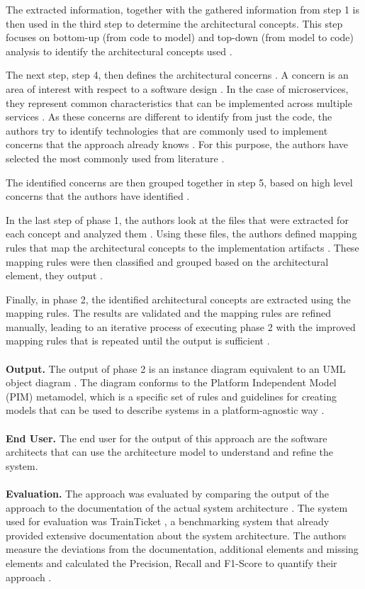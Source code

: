 The extracted information, together with the gathered information from step 1 is then used in the third step to determine the architectural concepts.
This step focuses on bottom-up (from code to model) and top-down (from model to code) analysis to identify the architectural concepts used \cite{Alshuqayran2018MiSAR}.

The next step, step 4, then defines the architectural concerns \cite{Alshuqayran2018MiSAR}.
A concern is an area of interest with respect to a software design \cite{SWEBOK}.
In the case of microservices, they represent common characteristics that can be implemented across multiple services \cite{Alshuqayran2018MiSAR}.
As these concerns are different to identify from just the code, the authors try to identify technologies that are commonly used to implement concerns that the approach already knows \cite{Alshuqayran2018MiSAR}.
For this purpose, the authors have selected the most commonly used from literature \cite{Alshuqayran2018MiSAR}.

The identified concerns are then grouped together in step 5, based on high level concerns that the authors have identified \cite{Alshuqayran2018MiSAR}.

In the last step of phase 1, the authors look at the files that were extracted for each concept and analyzed them \cite{Alshuqayran2018MiSAR}.
Using these files, the authors defined mapping rules that map the architectural concepts to the implementation artifacts \cite{Alshuqayran2018MiSAR}.
These mapping rules were then classified and grouped based on the architectural element, they output \cite{Alshuqayran2018MiSAR}.

Finally, in phase 2, the identified architectural concepts are extracted using the mapping rules.
The results are validated and the mapping rules are refined manually, leading to an iterative process of executing phase 2 with the improved mapping rules that is repeated until the output is sufficient \cite{Alshuqayran2020Thesis}.
\\ \\
\textbf{Output.}
The output of phase 2 is an instance diagram equivalent to an UML object diagram \cite{Alshuqayran2020Thesis}.
The diagram conforms to the Platform Independent Model (PIM) metamodel, which is a specific set of rules and guidelines for creating models that can be used to describe systems in a platform-agnostic way \cite{PIM}.
\\ \\
\textbf{End User.}
The end user for the output of this approach are the software architects that can use the architecture model to understand and refine the system.
\\ \\
\textbf{Evaluation.}
The approach was evaluated  by comparing the output of the approach to the documentation of the actual system architecture \cite{Alshuqayran2020Thesis}.
The system used for evaluation was TrainTicket \cite{Zhou2018TrainTicket}, a benchmarking system that already provided extensive documentation about the system architecture.
The authors measure the deviations from the documentation, additional elements and missing elements and calculated the Precision, Recall and F1-Score to quantify their approach \cite{Alshuqayran2020Thesis}.


